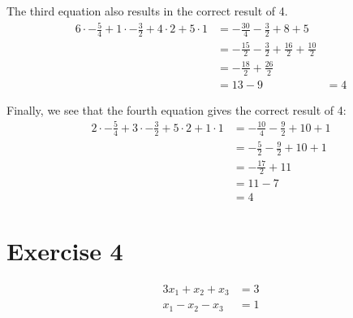\documentclass[a4paper]{article}
\begin{document}
The third equation also results in the correct result of 4.
\begin{align*}
6 \cdot - \frac{5}{4} + 1 \cdot - \frac{3}{2} + 4 \cdot 2 + 5 \cdot 1
&= - \frac{30}{4} - \frac{3}{2} + 8 + 5 \\
&= - \frac{15}{2} - \frac{3}{2} + \frac{16}{2} + \frac{10}{2} \\
&= - \frac{18}{2} + \frac{26}{2} \\
&= 13 - 9
&= 4
\end{align*}

Finally, we see that the fourth equation gives the correct result of 4:
\begin{align*}
2 \cdot - \frac{5}{4} + 3 \cdot - \frac{3}{2} + 5 \cdot 2 + 1 \cdot 1
&= - \frac{10}{4} - \frac{9}{2} + 10 + 1 \\
&= - \frac{5}{2} - \frac{9}{2} + 10 + 1 \\
&= - \frac{17}{2} + 11 \\
&= 11 - 7 \\
&= 4
\end{align*}

\section*{Exercise 4}
\begin{align*}
  3x_1 + x_2 + x_3 &= 3 \\
  x_1 - x_2 -x_3 &= 1
\end{align*}
\end{document}
